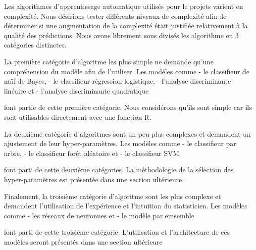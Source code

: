 Les algorithmes d'apprentissage automatique utilisés pour le projets varient en complexité. Nous désirions tester différents niveaux de complexité afin de déterminer si une augmentation de la complexité était justifiée relativement à la qualité des prédictions. Nous avons librement sous divisés les algorithme en 3 catégories distinctes. 

La première catégorie d'algoritme les plus simple ne demande qu'une compréhension du modèle afin de l'utiliser. Les modèles comme 
- le classifieur de naïf de Bayes, 
- le classifieur régression logistique, 
- l'analyse discriminante linéaire et 
- l'analyse discriminante quadratique 

font partie de cette première catégorie. Nous considérons qu'ils sont simple car ils sont utilisables directement avec une fonction R. 

La deuxième catégorie d'algoritmes sont un peu plus complexes et demandent un ajustement de leur hyper-paramètres. Les modèles comme 
- le classifieur par arbre, 
- le classifieur forêt aléatoire et 
- le classifieur SVM 

font parti de cette deuxième catégories. La méthodologie de la sélection des hyper-paramètres est présentée dans une section ultérieure.

Finalement, la troisième catégorie d'algoritme sont les plus complexe et demandent l'utilisation de l'expérience et l'intuition du statisticien. Les modèles comme 
- les réseaux de neuronnes et 
- le modèle par emsemble 

font parti de cette troisième catégorie. L'utilisation et l'architecture de ces modèles seront présentés dans une section ultérieure

\subsection{}


\subsection{}

